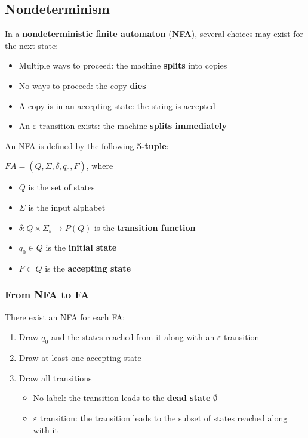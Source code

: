\documentclass{article}
\begin{document}
\subsection{Nondeterminism}
In a \textbf{nondeterministic finite automaton} (\textbf{NFA}), several choices may exist for the next state:
\begin{itemize}
    \item Multiple ways to proceed: the machine \textbf{splits} into copies
    \item No ways to proceed: the copy \textbf{dies}
    \item A copy is in an accepting state: the string is accepted
    \item An $\varepsilon$ transition exists: the machine \textbf{splits immediately}
\end{itemize}
An NFA is defined by the following \textbf{5-tuple}:
\begin{center}
    $FA = (Q, \Sigma, \delta, q_0, F)$, where
\end{center}
\begin{itemize}
    \item $Q$ is the set of states
    \item $\Sigma$ is the input alphabet
    \item $\delta:Q\times\Sigma_\varepsilon\rightarrow P(Q)$ is the \textbf{transition function}
    \item $q_0 \in Q$ is the \textbf{initial state}
    \item $F \subset Q$ is the \textbf{accepting state}
\end{itemize}
\subsubsection{From NFA to FA}
There exist an NFA for each FA: 
\begin{enumerate}
    \item Draw $q_0$ and the states reached from it along with an $\varepsilon$ transition
    \item Draw at least one accepting state
    \item Draw all transitions
        \begin{itemize}
            \item No label: the transition leads to the \textbf{dead state} $\emptyset$  
            \item $\varepsilon$ transition: the transition leads to the subset of states reached along with it
        \end{itemize}
\end{enumerate}
\end{document}
